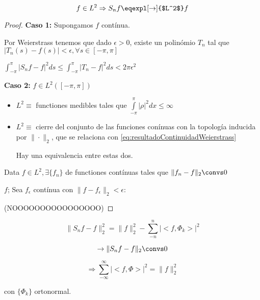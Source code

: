 		\begin{theorem}

			\[ f \in L^2 \Rightarrow S_n f \eqexpl[\rightarrow]{$L^2$} f \]

		\end{theorem}

		\begin{proof}

			\textbf{Caso 1:} Supongamos $f$ contínua.

			Por Weierstrass tenemos que dado $\epsilon > 0$, existe un polinómio $T_n$ tal que $|T_n(s) - f(s)| < \epsilon, \forall s \in [-\pi,\pi]$

			\(
				\int^{\pi}_{-\pi} | S_n f - f |^2 ds \leq \int^\pi_{-\pi} | T_n - f |^2 ds < 2 \pi \epsilon^2 \label{eq:resultadoContinuidadWeierstrass}
			\)

			\textbf{Caso 2:} $f \in L^2 ([-\pi,\pi])$

			\begin{itemize}

				\item $L^2 \equiv$ functiones medibles tales que $\int\limits^\pi_{-\pi} |\rho|^2 dx \leq \infty $

				\item $L^2 \equiv$ cierre del conjunto de las funciones conínuas con la topología inducida por $\|\cdot\|_2$, que se relaciona con \ref{eq:resultadoContinuidadWeierstrass}

				Hay una equivalencia entre estas dos.

			\end{itemize}

			Data $f\in L^2, \exists \{f_n\}$ de functiones contínuas tales que $\|f_n - f\|_2 \convs 0$

			$f$; Sea $f_\epsilon$ contínua con $\|f-f_\epsilon\|_2 < \epsilon$:

			(NOOOOOOOOOOOOOOOO)



		\end{proof}

		\begin{corol}

		\[ \| S_n f - f \|_2^2 = \|f\|_2^2 - \sum_{-n}^{n} |<f, \Phi_k>|^2\]

		\[\rightarrow \|S_n f - f \|_2 \convs 0 \]

		\[\Rightarrow  \sum_{-\infty}^{\infty} | <f, \Phi>|^2 = \|f\|_2^2 \]

		con $\{\Phi_k\}$ ortonormal.

		\end{corol}


